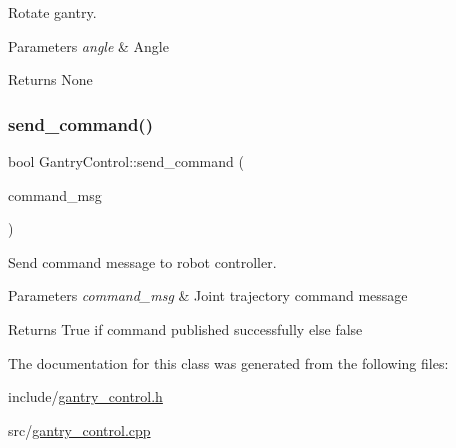 Rotate gantry. 


\begin{DoxyParams}{Parameters}
{\em angle} & Angle \\
\hline
\end{DoxyParams}
\begin{DoxyReturn}{Returns}
None 
\end{DoxyReturn}
\mbox{\label{classGantryControl_ab271ce06b0d336eddb26e1ba5a2ce594}} 
\subsubsection{\texorpdfstring{send\+\_\+command()}{send\_command()}}
{\footnotesize\ttfamily bool Gantry\+Control\+::send\+\_\+command (\begin{DoxyParamCaption}\item[{trajectory\+\_\+msgs\+::\+Joint\+Trajectory}]{command\+\_\+msg }\end{DoxyParamCaption})}



Send command message to robot controller. 


\begin{DoxyParams}{Parameters}
{\em command\+\_\+msg} & Joint trajectory command message \\
\hline
\end{DoxyParams}
\begin{DoxyReturn}{Returns}
True if command published successfully else false 
\end{DoxyReturn}


The documentation for this class was generated from the following files\+:\begin{DoxyCompactItemize}
\item 
include/\hyperlink{gantry__control_8h}{gantry\+\_\+control.\+h}\item 
src/\hyperlink{gantry__control_8cpp}{gantry\+\_\+control.\+cpp}\end{DoxyCompactItemize}
